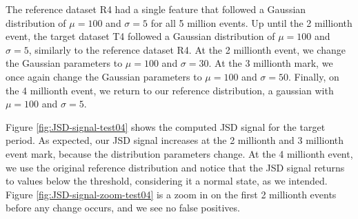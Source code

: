 The reference dataset R4 had a single feature that followed a Gaussian distribution of $\mu=100$ and $\sigma=5$ for all 5 million events. Up until the 2 millionth event, the target dataset T4 followed a Gaussian distribution of $\mu=100$ and $\sigma=5$, similarly to the reference dataset R4. At the 2 millionth event, we change the Gaussian parameters to $\mu=100$ and $\sigma=30$. At the 3 millionth mark, we once again change the Gaussian parameters to $\mu=100$ and $\sigma=50$. Finally, on the 4 millionth event, we return to our reference distribution, a gaussian with $\mu=100$ and $\sigma=5$.


Figure \ref{fig:JSD-signal-test04} shows the computed JSD signal for the target period. As expected, our JSD signal increases at the 2 millionth and 3 millionth event mark, because the distribution parameters change. At the 4 millionth event, we use the original reference distribution and notice that the JSD signal returns to values below the threshold, considering it a normal state, as we intended. Figure \ref{fig:JSD-signal-zoom-test04} is a zoom in on the first 2 millionth events before any change occurs, and we see no false positives.

